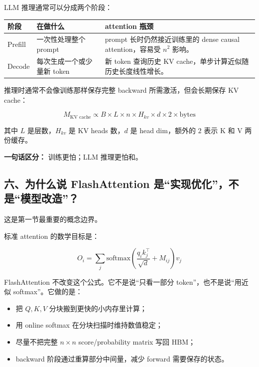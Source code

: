 LLM 推理通常可以分成两个阶段：

\begin{center}
{\small
\begin{tabular}{p{3cm}p{4.6cm}p{5.3cm}}
\hline
\textbf{阶段} & \textbf{在做什么} & \textbf{attention 瓶颈} \\
\hline
Prefill & 一次性处理整个 prompt & prompt 长时仍然接近训练里的 dense causal attention，容易受 $n^2$ 影响。 \\
Decode & 每次生成一个或少量新 token & 新 token 查询历史 KV cache，单步计算近似随历史长度线性增长。 \\
\hline
\end{tabular}
}
\end{center}

推理时通常不会像训练那样保存完整 backward 所需激活，但会长期保存 KV cache：

\[
M_{\text{KV cache}}
\propto
B \times L \times n \times H_{kv} \times d \times 2 \times \text{bytes}
\]

其中 $L$ 是层数，$H_{kv}$ 是 KV heads 数，$d$ 是 head dim，额外的 $2$ 表示 K 和 V 两份缓存。

\begin{intubox}
\textbf{一句话区分：} 训练更怕；LLM 推理更怕和。
\end{intubox}

\subsection{六、为什么说 FlashAttention 是“实现优化”，不是“模型改造”？}

这是第一节最重要的概念边界。

标准 attention 的数学目标是：

\[
O_i = \sum_j \mathrm{softmax}\left(\frac{q_i k_j^\top}{\sqrt{d}} + M_{ij}\right)v_j
\]

FlashAttention 不改变这个公式。它不是说“只看一部分 token”，也不是说“用近似 softmax”。它做的是：

\begin{itemize}[leftmargin=1.5em]
  \item 把 $Q,K,V$ 分块搬到更快的小内存里计算；
  \item 用 online softmax 在分块扫描时维持数值稳定；
  \item 尽量不把完整 $n \times n$ score/probability matrix 写回 HBM；
  \item backward 阶段通过重算部分中间量，减少 forward 需要保存的状态。
\end{itemize}

